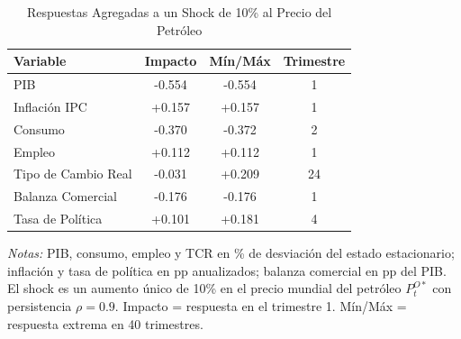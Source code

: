 \begin{table}[htbp]
\centering
\caption{Respuestas Agregadas a un Shock de 10\% al Precio del Petróleo}
\label{tab:oil_chiib0p01_agg}
\begin{threeparttable}
\begin{tabular}{@{}l c c c@{}}
\toprule
Variable & Impacto & Mín/Máx & Trimestre \\
\midrule
PIB & -0.554 & -0.554 & 1 \\
Inflación IPC & +0.157 & +0.157 & 1 \\
Consumo & -0.370 & -0.372 & 2 \\
Empleo & +0.112 & +0.112 & 1 \\
Tipo de Cambio Real & -0.031 & +0.209 & 24 \\
Balanza Comercial & -0.176 & -0.176 & 1 \\
Tasa de Política & +0.101 & +0.181 & 4 \\
\bottomrule
\end{tabular}
\begin{tablenotes}[flushleft]
\footnotesize
\item \textit{Notas:} PIB, consumo, empleo y TCR en \% de desviación del estado estacionario; inflación y tasa de política en pp anualizados; balanza comercial en pp del PIB. El shock es un aumento único de 10\% en el precio mundial del petróleo $P^{O*}_t$ con persistencia $\rho = 0.9$. Impacto = respuesta en el trimestre 1. Mín/Máx = respuesta extrema en 40 trimestres.
\end{tablenotes}
\end{threeparttable}
\end{table}
